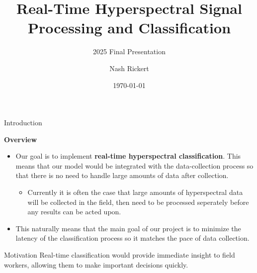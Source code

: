 \documentclass[aspectratio=169,xcolor=dvipsnames]{beamer}
\title{Real-Time Hyperspectral Signal Processing and Classification}
\subtitle{2025 Final Presentation}
\author{Nash Rickert}
\institute
{
    Electrical and Computer Engineering Department, REU \\
    Montana State University %
}
\date{\today} %
\newcommand\myheading[1]{%
  \par\bigskip
  {\Large\bfseries#1}\par\smallskip}
\begin{document}
\begin{frame}
    \titlepage
\end{frame}

\begin{frame}{Introduction}
    \myheading{Overview}
    \begin{itemize}
        \item Our goal is to implement \textbf{real-time hyperspectral classification}. This means that our model would be integrated with the data-collection process so that there is no need to handle large amounts of data after collection.
              \begin{itemize}
                  \item Currently it is often the case that large amounts of hyperspectral data will be collected in the field, then need to be processed seperately before any results can be acted upon.
              \end{itemize}
        \item This naturally means that the main goal of our project is to minimize the latency of the classification process so it matches the pace of data collection.
    \end{itemize}

    \begin{block}{Motivation}
        Real-time classification would provide immediate insight to field workers, allowing them to make important decisions quickly.
    \end{block}
\end{frame}
\end{document}
